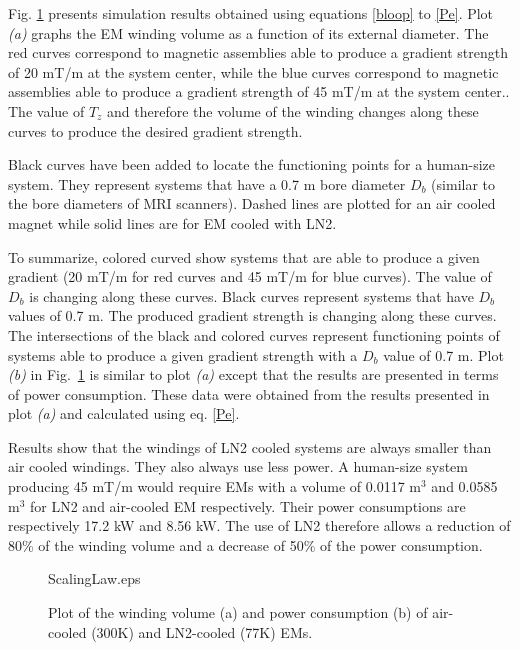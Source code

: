 Fig. \ref{fig:ScalingLaw} presents simulation results obtained using equations \ref{bloop} to \ref{Pe}. Plot \emph{(a)} graphs the EM winding volume as a function of its external diameter. The red curves correspond to magnetic assemblies able to produce a gradient strength of 20 mT/m at the system center, while the blue curves correspond to magnetic assemblies  able to produce a gradient strength of 45 mT/m at the system center.. The value of $T_z$ and therefore the volume of the winding changes along these curves to produce the desired gradient strength.

Black curves have been added to locate the functioning points for a human-size system. They represent systems that have a 0.7 m bore diameter $D_b$ (similar to the bore diameters of MRI scanners). Dashed lines are plotted for an air cooled magnet while solid lines are for EM cooled with LN2.



To summarize, colored curved show systems that are able to produce a given gradient (20 mT/m for red curves and 45 mT/m for blue curves). 
 The value of $D_b$ is changing along these curves. Black curves represent systems that have $D_b$ values of 0.7 m. 
 The produced gradient strength is changing along these curves. 
  The intersections of the black and colored curves represent functioning points of systems able to produce a given gradient strength with a $D_b$ value of 0.7 m.
Plot \emph{(b)} in Fig.~\ref{fig:ScalingLaw} is similar to plot \emph{(a)} except that the results are presented in terms of power consumption. These data were obtained from the results presented in plot \emph{(a)} and calculated using eq. \ref{Pe}.

Results show that the windings of LN2 cooled systems are always smaller than air cooled windings. They also always use less power. A human-size system producing 45 mT/m would require EMs with a volume of 0.0117 m$^3$ and 0.0585 m$^3$ for LN2 and air-cooled EM respectively. Their power consumptions are respectively 17.2 kW and 8.56 kW. The use of LN2 therefore allows a reduction of 80\% of the winding volume and a decrease of 50\% of the power consumption.




\begin{figure}
	\centering
	\begin{overpic}[width=0.45\columnwidth]{ScalingLaw.eps}
	\end{overpic}
	\caption{Plot of the winding volume (a) and power consumption (b) of air-cooled (300K) and LN2-cooled (77K) EMs.}
	\label{fig:ScalingLaw}
\end{figure}



